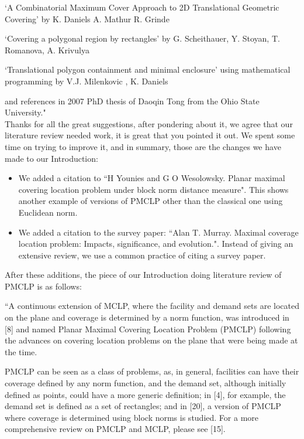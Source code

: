 		`A Combinatorial Maximum Cover Approach to 2D Translational Geometric Covering' by K. Daniels A. Mathur R. Grinde
		
		`Covering a polygonal region by rectangles' by G. Scheithauer, Y. Stoyan, T. Romanova, A. Krivulya
		
		`Translational polygon containment and minimal enclosure' using mathematical programming
		by V.J. Milenkovic , K. Daniels
		
		and references in 2007 PhD thesis of Daoqin Tong from the Ohio State University."
		\\
		
		Thanks for all the great suggestions, after pondering about it, we agree that our literature review needed work, it is great that you pointed it out.
		We spent some time on trying to improve it, and in summary, those are the changes we have made to our Introduction:

		\begin{itemize}
			\item We added a citation to ``H Younies and G O Wesolowsky. Planar maximal covering location problem under block norm distance measure". This shows another example of versions of PMCLP other than the classical one using Euclidean norm.
			\item We added a citation to the survey paper: ``Alan T. Murray. Maximal coverage location problem: Impacts, significance, and evolution.". Instead of giving an extensive review, we use a common practice of citing a survey paper. 
		\end{itemize}
	
	After these additions, the piece of our Introduction doing literature review of PMCLP is as follows:
	
	``A continuous extension of MCLP, where the facility and demand sets are located on the plane and coverage is determined by a norm function, was introduced in [8] and named Planar Maximal	Covering Location Problem (PMCLP) following the advances on covering location problems on the	plane that were being made at the time.
	
	PMCLP can be seen as a class of problems, as, in general, facilities can have their coverage
	defined by any norm function, and the demand set, although initially defined as points, could have a more generic definition; in [4], for example, the demand set is defined as a set of rectangles; and in [20], a version of PMCLP where coverage is determined using block norms is studied. For a more comprehensive review on PMCLP and MCLP, please see [15].
	
